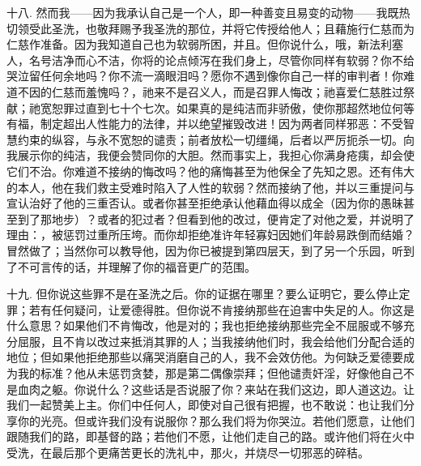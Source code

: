 十八. 然而我——因为我承认自己是一个人，即一种善变且易变的动物——我既热切领受此圣洗，也敬拜赐予我圣洗的那位，并将它传授给他人；且藉施行仁慈而为仁慈作准备。因为我知道自己也为软弱所困，并且。但你说什么，哦，新法利塞人，名号洁净而心不洁，你将的论点倾泻在我们身上，尽管你同样有软弱？你不给哭泣留任何余地吗？你不流一滴眼泪吗？愿你不遇到像你自己一样的审判者！你难道不因的仁慈而羞愧吗？，祂来不是召义人，而是召罪人悔改；祂喜爱仁慈胜过祭献；祂宽恕罪过直到七十个七次。如果真的是纯洁而非骄傲，使你那超然地位何等有福，制定超出人性能力的法律，并以绝望摧毁改进！因为两者同样邪恶：不受智慧约束的纵容，与永不宽恕的谴责；前者放松一切缰绳，后者以严厉扼杀一切。向我展示你的纯洁，我便会赞同你的大胆。然而事实上，我担心你满身疮痍，却会使它们不治。你难道不接纳的悔改吗？他的痛悔甚至为他保全了先知之恩。还有伟大的本人，他在我们救主受难时陷入了人性的软弱？然而接纳了他，并以三重提问与宣认治好了他的三重否认。或者你甚至拒绝承认他藉血得以成全（因为你的愚昧甚至到了那地步）？或者的犯过者？但看到他的改过，便肯定了对他之爱，并说明了理由：，被惩罚过重所压垮。而你却拒绝准许年轻寡妇因她们年龄易跌倒而结婚？冒然做了；当然你可以教导他，因为你已被提到第四层天，到了另一个乐园，听到了不可言传的话，并理解了你的福音更广的范围。\par

十九. 但你说这些罪不是在圣洗之后。你的证据在哪里？要么证明它，要么停止定罪；若有任何疑问，让爱德得胜。但你说不肯接纳那些在迫害中失足的人。你这是什么意思？如果他们不肯悔改，他是对的；我也拒绝接纳那些完全不屈服或不够充分屈服，且不肯以改过来抵消其罪的人；当我接纳他们时，我会给他们分配合适的地位；但如果他拒绝那些以痛哭消磨自己的人，我不会效仿他。为何缺乏爱德要成为我的标准？他从未惩罚贪婪，那是第二偶像崇拜；但他谴责奸淫，好像他自己不是血肉之躯。你说什么？这些话是否说服了你？来站在我们这边，即人道这边。让我们一起赞美上主。你们中任何人，即使对自己很有把握，也不敢说：也让我们分享你的光亮。但或许我们没有说服你？那么我们将为你哭泣。若他们愿意，让他们跟随我们的路，即基督的路；若他们不愿，让他们走自己的路。或许他们将在火中受洗，在最后那个更痛苦更长的洗礼中，那火，并烧尽一切邪恶的碎秸。\par

